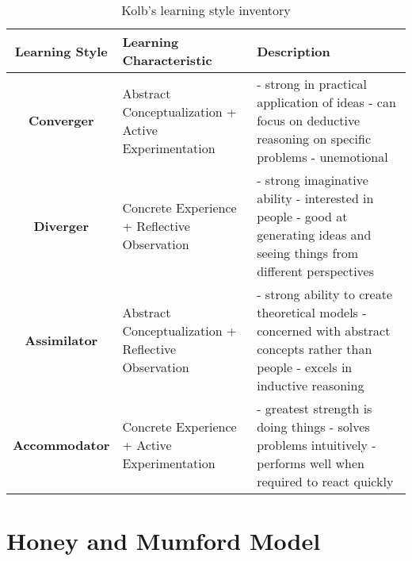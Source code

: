 \documentclass[12pt]{report}
\begin{document}
\begin{singlespacing}
    \begin{table}[H]
        \hspace{-0.5in}
        \begin{tabular}{|c|p{2in}|p{2.5in}|}
            \hline
            \textbf{Learning Style} & \textbf{Learning Characteristic} & \textbf{Description} \\ \hline
            \textbf{Converger} & Abstract Conceptualization \newline + Active Experimentation &
            - strong in practical application of ideas \newline
            - can focus on deductive reasoning on specific problems \newline
            - unemotional \\ \hline
            \textbf{Diverger} & Concrete Experience \newline + Reflective Observation &
            - strong imaginative ability \newline
            - interested in people \newline
            - good at generating ideas and seeing things from different perspectives \\ \hline
            \textbf{Assimilator} & Abstract Conceptualization \newline + Reflective Observation &
            - strong ability to create theoretical models \newline
            - concerned with abstract concepts rather than people \newline
            - excels in inductive reasoning \\ \hline
            \textbf{Accommodator} & Concrete Experience \newline + Active Experimentation &
            - greatest strength is doing things \newline
            - solves problems intuitively \newline
            - performs well when required to react quickly \\ \hline
        \end{tabular}
        \caption{Kolb's learning style inventory}
    \end{table}
\end{singlespacing}

\pagebreak

\section{Honey and Mumford Model}
\end{document}
